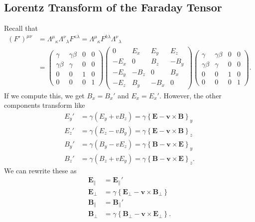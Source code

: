 \documentclass{article}
\numberwithin{equation}{section}
\begin{document}
\subsection{Lorentz Transform of the Faraday Tensor}
Recall that 
\begin{align}
    (F')^{\mu\nu} &= \Lambda^{\mu}{}_{\kappa}\Lambda^\nu{}_{\lambda}F^{\kappa\lambda} = \Lambda^{\mu}{}_{\kappa}F^{k\lambda}\Lambda^{\nu}{}_{\lambda} \\ 
    &= \begin{pmatrix}
        \gamma & \gamma \beta & 0 & 0 \\ 
        \gamma \beta & \gamma & 0 & 0 \\
        0 & 0 & 1 & 0 \\
        0 & 0 & 0 & 1
    \end{pmatrix}\begin{pmatrix}
        0 & E_x & E_y & E_z \\ 
        -E_x & 0 & B_z & - B_y \\ 
        -E_y & -B_z & 0 & B_x \\
        -E_z & B_y & -B_x & 0
    \end{pmatrix}\begin{pmatrix}
        \gamma & \gamma \beta & 0 & 0 \\ 
        \gamma \beta & \gamma & 0 & 0 \\
        0 & 0 & 1 & 0 \\
        0 & 0 & 0 & 1
    \end{pmatrix}.
\end{align}
If we compute this, we get $B_x = B_x'$ and $E_x = E_x'.$ However, the other components transform like 
\begin{align}
    E_y' &= \gamma(E_y + vB_z) = \gamma \left\{\bm{E} - \bm{v} \times \bm{B}\right\}_y \\ 
    E_z' &= \gamma(E_z - vB_y) = \gamma \left\{\bm{E} - \bm{v} \times \bm{B}\right\}_z \\
    B_y' &= \gamma(B_y - vE_z) = \gamma \left\{\bm{B} - \bm{v} \times \bm{E}\right\}_y \\
    B_z' &= \gamma(B_z + vE_y) = \gamma \left\{\bm{B} - \bm{v} \times \bm{E}\right\}_z.
\end{align}
We can rewrite these as 
\begin{align}
    \bm{E}_{\parallel} &= \bm{E}_{\parallel}' \\
    \bm{E}_{\perp} &= \gamma \left\{\bm{E}_\perp - \bm{v} \times \bm{B}_\perp\right\} \\
    \bm{B}_{\parallel} &= \bm{B}_{\parallel}' \\
    \bm{B}_{\perp} &= \gamma \left\{\bm{B}_\perp - \bm{v} \times \bm{E}_\perp\right\}.
\end{align}
\end{document}
